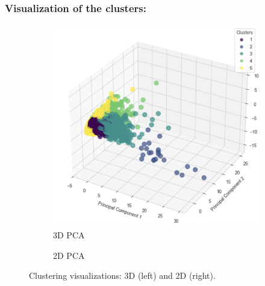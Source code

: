 \subsubsection{Visualization of the clusters:}
\begin{figure}[H]
    \centering
    \begin{subfigure}[b]{0.45\textwidth}
        \centering
        \includegraphics[width=\textwidth]{src/figs/3d_PCA_HC.png}
        \caption{3D PCA}
        \label{fig:3D_pca}
    \end{subfigure}
    \hfill
    \begin{subfigure}[b]{0.45\textwidth}
        \centering
        \caption{2D PCA}
        \label{fig:PCA_2d}
    \end{subfigure}
    \caption{Clustering visualizations: 3D (left) and 2D (right).}
    \label{fig:comparison1}
\end{figure}

